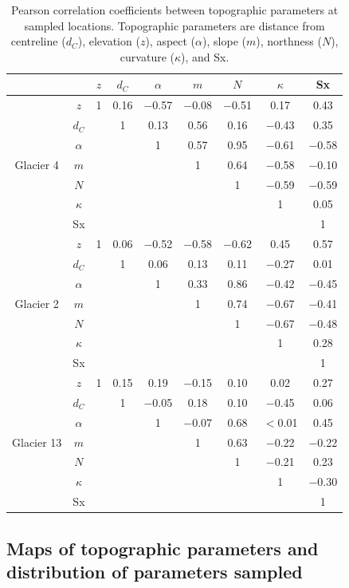 \documentclass{sfuthesis}
\newcommand{\params}{Topographic parameters are distance from centreline ($d_C$), elevation ($z$), aspect ($\alpha$), slope ($m$), northness ($N$), curvature ($\kappa$), and Sx. }
\begin{document}
\begin{table}[H]
\centering
\caption{Pearson correlation coefficients between topographic parameters at sampled locations. \params}
\label{tab:pearson_correlation}
\begin{tabular}{cc|ccccccc}
 &  & $z$ & $d_C$ & $\alpha$ & $m$ & $N$ & $\kappa$ & Sx \\ \hline
\multirow{7}{*}{Glacier 4} & $z$ & 1 & 0.16 & $-$0.57 & $-$0.08 & $-$0.51 & 0.17 & 0.43 \\
 & $d_C$ &  & 1 & 0.13 & 0.56 & 0.16 & $-$0.43 & 0.35 \\
 & $\alpha$ &   &  & 1 & 0.57 & 0.95 & $-$0.61 & $-$0.58 \\
 & $m$ &   &   &   & 1 & 0.64 & $-$0.58 & $-$0.10 \\
 & $N$ &   &   &   &   & 1 & $-$0.59 & $-$0.59 \\
 & $\kappa$ &   &   &   &   &   & 1 & 0.05 \\
 & Sx &   &   &   &   &   &   & 1 \\ \hline
\multirow{7}{*}{Glacier 2} & $z$ & 1 & 0.06 & $-$0.52 & $-$0.58 & $-$0.62 & 0.45 & 0.57 \\
 & $d_C$ &   & 1 & 0.06 & 0.13 & 0.11 & $-$0.27 & 0.01 \\
 & $\alpha$ &   &  & 1 & 0.33 & 0.86 & $-$0.42 & $-$0.45 \\
 & $m$ &   &   &   & 1 & 0.74 & $-$0.67 & $-$0.41 \\
 & $N$ &   &   &   &   & 1 & $-$0.67 & $-$0.48 \\
 & $\kappa$ & &   &   &   &   & 1 & 0.28 \\
 & Sx &   &   &   &   &   &   & 1 \\ \hline
\multirow{7}{*}{Glacier 13} & $z$ & 1 & 0.15 & 0.19 & $-$0.15 & 0.10 & 0.02 & 0.27 \\
 & $d_C$ &   & 1 & $-$0.05 & 0.18 & 0.10 & $-$0.45 & 0.06 \\
 & $\alpha$ &   &   & 1 & $-$0.07 & 0.68 & $<$0.01 & 0.45 \\
 & $m$ &   &   &   & 1 & 0.63 & $-$0.22 & $-$0.22 \\
 & $N$ &   &   &   &   & 1 & $-$0.21 & 0.23 \\
 & $\kappa$ &   &   &   &   &   & 1 & $-$0.30 \\
 & Sx &   &   &   &   &   &   & 1
\end{tabular}
\end{table}


\subsection{Maps of topographic parameters and distribution of parameters sampled}
\end{document}
